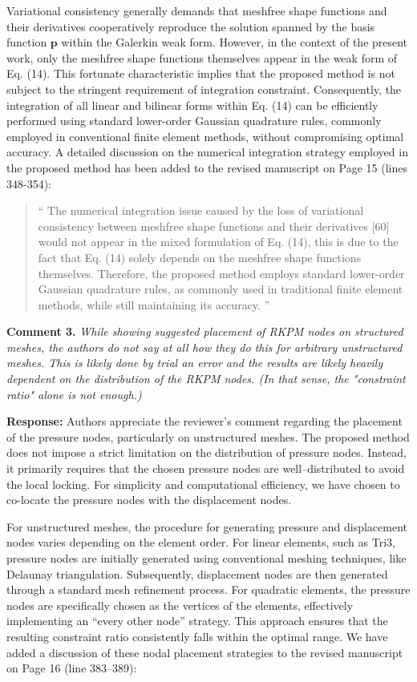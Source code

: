 \documentclass{article}
\begin{document}
Variational consistency generally demands that meshfree shape functions and their derivatives cooperatively reproduce the solution spanned by the basis function $\boldsymbol{p}$ within the Galerkin weak form.
However, in the context of the present work, only the meshfree shape functions themselves appear in the weak form of Eq. (14).
This fortunate characteristic implies that the proposed method is not subject to the stringent requirement of integration constraint.
Consequently, the integration of all linear and bilinear forms within Eq. (14) can be efficiently performed using standard lower-order Gaussian quadrature rules, commonly employed in conventional finite element methods, without compromising optimal accuracy.
A detailed discussion on the numerical integration strategy employed in the proposed method has been added to the revised manuscript on Page 15 (lines 348-354):

\begin{quote}``
The numerical integration issue caused by the loss of variational consistency between meshfree shape functions and their derivatives [60] would not appear in the mixed formulation of Eq. (14), this is due to the fact that Eq. (14) solely depends on the meshfree shape functions themselves.
Therefore, the proposed method employs standard lower-order Gaussian quadrature rules, as commonly used in traditional finite element methods, while still maintaining its accuracy.
''\end{quote}

\textbf{Comment 3.} \textit{While showing suggested placement of RKPM nodes on structured meshes, the authors do not say at all how they do this for arbitrary unstructured meshes. This is likely done by trial an error and the results are likely heavily dependent on the distribution of the RKPM nodes. (In that sense, the "constraint ratio" alone is not enough.)}

\textbf{Response:} 
Authors appreciate the reviewer's comment regarding the placement of the pressure nodes, particularly on unstructured meshes.
The proposed method does not impose a strict limitation on the distribution of pressure nodes.
Instead, it primarily requires that the chosen pressure nodes are well--distributed to avoid the local locking.
For simplicity and computational efficiency, we have chosen to co-locate the pressure nodes with the displacement nodes.

For unstructured meshes, the procedure for generating pressure and displacement nodes varies depending on the element order.
For linear elements, such as Tri3, pressure nodes are initially generated using conventional meshing techniques, like Delaunay triangulation.
Subsequently, displacement nodes are then generated through a standard mesh refinement process.
For quadratic elements, the pressure nodes are specifically chosen as the vertices of the elements, effectively implementing an ``every other node'' strategy.
This approach ensures that the resulting constraint ratio consistently falls within the optimal range.
We have added a discussion of these nodal placement strategies to the revised manuscript on Page 16 (line 383--389):
\end{document}
